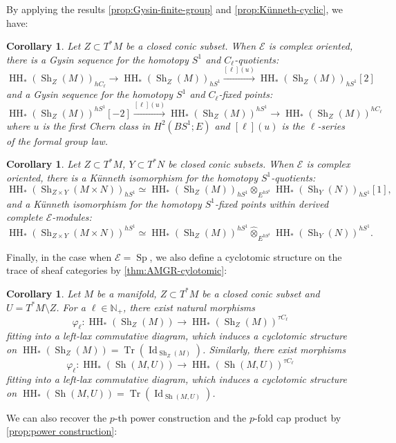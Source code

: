 \documentclass[11pt]{amsart}
\numberwithin{equation}{section}
\theoremstyle{plain}
\newtheorem{Coro}[coro]{Corollary}
\theoremstyle{definition}
\theoremstyle{remark}
\newcommand{\bN} { {\mathbb{N}}}
\newcommand{\cE} { {\mathcal{E}}}
\newcommand{\Id}{{\operatorname{Id}}}
\newcommand{\Sh} { {\operatorname{Sh}}}
\newcommand\HH{\operatorname{HH}}
\newcommand\Tr{\operatorname{Tr}}
\newcommand\Sp{ {\operatorname{Sp} } }
\begin{document}
By applying the results \autoref{prop:Gysin-finite-group} and \autoref{prop:Künneth-cyclic}, we have:

\begin{Coro}\label{cor: Gysin sheaf}
    Let $Z \subset T^*M$ be a closed conic subset. When $\cE$ is complex oriented, there is a Gysin sequence for the homotopy $S^1$ and $C_\ell$-quotients:
    \[\HH_*(\Sh_Z(M))_{hC_\ell} \to \HH_*(\Sh_Z(M))_{hS^1} \xrightarrow{[\ell](u)} \HH_*(\Sh_Z(M))_{hS^1}[2]\]
    and a Gysin sequence for the homotopy $S^1$ and $C_\ell$-fixed points:
    \[\HH_*(\Sh_Z(M))^{hS^1}[-2] \xrightarrow{[\ell](u)} \HH_*(\Sh_Z(M))^{hS^1} \to \HH_*(\Sh_Z(M))^{hC_\ell}\]
    where $u$ is the first Chern class in $H^2(BS^1; E)$ and $[\ell](u)$ is the $\ell$-series of the formal group law.
\end{Coro}

\begin{Coro}\label{cor: Künneth sheaf}
    Let $Z \subset T^*M$, $Y \subset T^*N$ be closed conic subsets. When $\cE$ is complex oriented, there is a K\"unneth isomorphism for the homotopy $S^1$-quotients:
    \[\HH_*(\Sh_{Z\times Y}(M \times N))_{hS^1} \simeq \HH_*(\Sh_Z(M))_{hS^1} \otimes _{E^{hS^1}} \HH_*(\Sh_Y(N))_{hS^1}[1],\]
    and a K\"unneth isomorphism for the homotopy $S^1$-fixed points within derived complete $\cE$-modules:
    \[\HH_*(\Sh_{Z\times Y}(M \times N))^{hS^1} \simeq \HH_*(\Sh_Z(M))^{hS^1} \widehat\otimes _{E^{hS^1}} \HH_*(\Sh_Y(N))^{hS^1}.\]
\end{Coro}

Finally, in the case when $\cE = \Sp$, we also define a cyclotomic structure on the trace of sheaf categories by \autoref{thm:AMGR-cylotomic}:
\begin{Coro}
Let $M$ be a manifold, $Z \subset T^*M$ be a closed conic subset and $U = T^*M \setminus Z$. For a $\ell \in \bN_{+}$, there exist natural morphisms
\[\varphi_\ell: \HH_*(\Sh_Z(M)) \to \HH_*(\Sh_Z(M))^{\tau C_\ell}\]
fitting into a left-lax commutative diagram, which induces a cyclotomic structure on $\HH_*(\Sh_Z(M)) = \Tr(\Id_{\Sh_Z(M)})$. Similarly, there exist morphisms
\[\varphi_\ell: \HH_*(\Sh(M, U)) \to \HH_*(\Sh(M, U))^{\tau C_\ell}\]
fitting into a left-lax commutative diagram, which induces a cyclotomic structure on $\HH_*(\Sh(M, U)) = \Tr(\Id_{\Sh(M, U)})$. 
\end{Coro}

We can also recover the $p$-th power construction and the $p$-fold cap product by \autoref{prop:power construction}:
\end{document}
